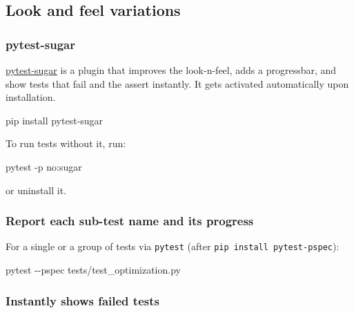 \documentclass[
]{report}
\newenvironment{Shaded}{\begin{snugshade}}{\end{snugshade}}
\newcommand{\AttributeTok}[1]{\textcolor[rgb]{0.40,0.45,0.13}{#1}}
\newcommand{\ExtensionTok}[1]{\textcolor[rgb]{0.00,0.23,0.31}{#1}}
\newcommand{\NormalTok}[1]{\textcolor[rgb]{0.00,0.23,0.31}{#1}}
\begin{document}
\subsection{Look and feel variations}\label{look-and-feel-variations}

\subsubsection{pytest-sugar}\label{pytest-sugar}

\href{https://github.com/Frozenball/pytest-sugar}{pytest-sugar} is a
plugin that improves the look-n-feel, adds a progressbar, and show tests
that fail and the assert instantly. It gets activated automatically upon
installation.

\begin{Shaded}
\begin{Highlighting}[]
\ExtensionTok{pip}\NormalTok{ install pytest{-}sugar}
\end{Highlighting}
\end{Shaded}

To run tests without it, run:

\begin{Shaded}
\begin{Highlighting}[]
\ExtensionTok{pytest} \AttributeTok{{-}p}\NormalTok{ no:sugar}
\end{Highlighting}
\end{Shaded}

or uninstall it.

\subsubsection{Report each sub-test name and its
progress}\label{report-each-sub-test-name-and-its-progress}

For a single or a group of tests via \texttt{pytest} (after
\texttt{pip\ install\ pytest-pspec}):

\begin{Shaded}
\begin{Highlighting}[]
\ExtensionTok{pytest} \AttributeTok{{-}{-}pspec}\NormalTok{ tests/test\_optimization.py}
\end{Highlighting}
\end{Shaded}

\subsubsection{Instantly shows failed
tests}\label{instantly-shows-failed-tests}
\end{document}
